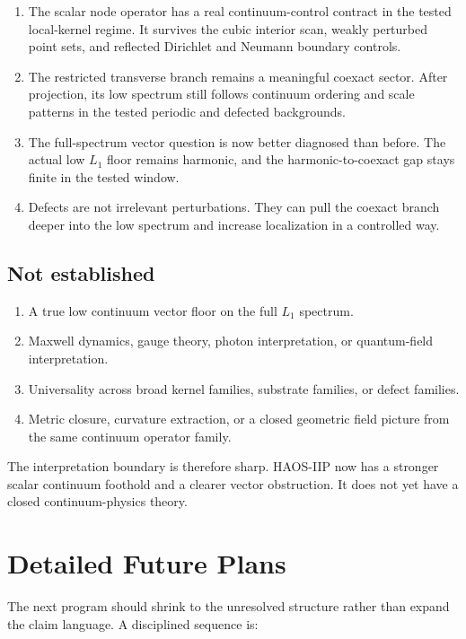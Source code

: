 \documentclass[11pt]{article}
\begin{document}
\begin{enumerate}
\item The scalar node operator has a real continuum-control contract in the tested local-kernel regime. It survives the cubic interior scan, weakly perturbed point sets, and reflected Dirichlet and Neumann boundary controls.
\item The restricted transverse branch remains a meaningful coexact sector. After projection, its low spectrum still follows continuum ordering and scale patterns in the tested periodic and defected backgrounds.
\item The full-spectrum vector question is now better diagnosed than before. The actual low $L_1$ floor remains harmonic, and the harmonic-to-coexact gap stays finite in the tested window.
\item Defects are not irrelevant perturbations. They can pull the coexact branch deeper into the low spectrum and increase localization in a controlled way.
\end{enumerate}

\subsection{Not established}

\begin{enumerate}
\item A true low continuum vector floor on the full $L_1$ spectrum.
\item Maxwell dynamics, gauge theory, photon interpretation, or quantum-field interpretation.
\item Universality across broad kernel families, substrate families, or defect families.
\item Metric closure, curvature extraction, or a closed geometric field picture from the same continuum operator family.
\end{enumerate}

The interpretation boundary is therefore sharp. HAOS-IIP now has a stronger scalar continuum foothold and a clearer vector obstruction. It does not yet have a closed continuum-physics theory.

\section{Detailed Future Plans}

The next program should shrink to the unresolved structure rather than expand the claim language. A disciplined sequence is:
\end{document}
